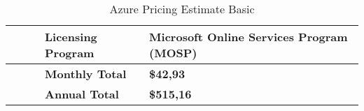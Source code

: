 \begin{landscape}
\begin{table}[]
\begin{tabular}{lllll}
                                        &                           &                 & Licensing Program                                                                                                                                                                                                                                & Microsoft Online Services Program (MOSP) \\ \hline
                                        &                           &                 & \textbf{Monthly Total}                                                                                                                                                                                                                           & \textbf{\$42,93}                         \\ \hline
                                        &                           &                 & \textbf{Annual Total}                                                                                                                                                                                                                            & \textbf{\$515,16}                        \\ \hline
\end{tabular}
\caption{Azure Pricing Estimate Basic}
\label{azPriceT1}
\end{table}
\end{landscape}
